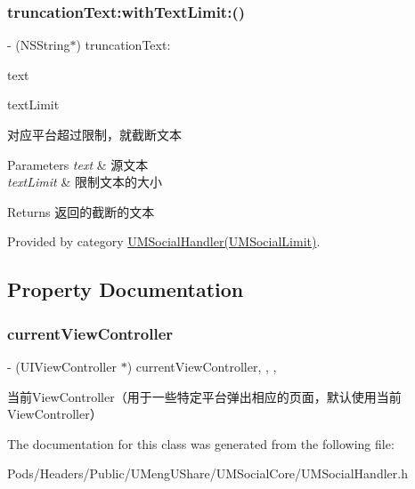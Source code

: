 \mbox{\label{interface_u_m_social_handler_ae19a28003b6af6039dc68c0b465386c0}} 
\subsubsection{\texorpdfstring{truncation\+Text\+:with\+Text\+Limit\+:()}{truncationText:withTextLimit:()}\hspace{0.1cm}{\footnotesize\ttfamily [2/2]}}
{\footnotesize\ttfamily -\/ (N\+S\+String$\ast$) truncation\+Text\+: \begin{DoxyParamCaption}\item[{(N\+S\+String $\ast$)}]{text }\item[{withTextLimit:(N\+S\+U\+Integer)}]{text\+Limit }\end{DoxyParamCaption}}

对应平台超过限制，就截断文本


\begin{DoxyParams}{Parameters}
{\em text} & 源文本 \\
\hline
{\em text\+Limit} & 限制文本的大小\\
\hline
\end{DoxyParams}
\begin{DoxyReturn}{Returns}
返回的截断的文本 
\end{DoxyReturn}


Provided by category \mbox{\hyperlink{category_u_m_social_handler_07_u_m_social_limit_08_ae19a28003b6af6039dc68c0b465386c0}{U\+M\+Social\+Handler(\+U\+M\+Social\+Limit)}}.



\subsection{Property Documentation}
\mbox{\label{interface_u_m_social_handler_a797b20d6bbafd076123413b08c0faa14}} 
\subsubsection{\texorpdfstring{current\+View\+Controller}{currentViewController}}
{\footnotesize\ttfamily -\/ (U\+I\+View\+Controller $\ast$) current\+View\+Controller\hspace{0.3cm}{\ttfamily [read]}, {\ttfamily [write]}, {\ttfamily [nonatomic]}, {\ttfamily [strong]}}

当前\+View\+Controller（用于一些特定平台弹出相应的页面，默认使用当前\+View\+Controller） 

The documentation for this class was generated from the following file\+:\begin{DoxyCompactItemize}
\item 
Pods/\+Headers/\+Public/\+U\+Meng\+U\+Share/\+U\+M\+Social\+Core/U\+M\+Social\+Handler.\+h\end{DoxyCompactItemize}
